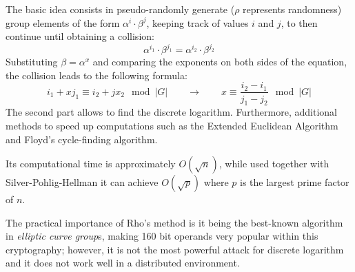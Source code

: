 The basic idea consists in pseudo-randomly generate ($\rho$ represents randomness) group elements of the form $\alpha^i \cdot \beta^j$, keeping track of values $i$ and $j$, to then continue until obtaining a collision:
$$\alpha^{i_1} \cdot \beta^{j_1} = \alpha^{i_2} \cdot \beta^{j_2}$$
Substituting $\beta = \alpha^x$ and comparing the exponents on both sides of the equation, the collision leads to the following formula:
$$i_1 + xj_1 \equiv i_2 + jx_2 \mod |G| \qquad \rightarrow \qquad x \equiv \frac{i_2 - i_1}{j_1 - j_2} \mod |G|$$ 
The second part allows to find the discrete logarithm. Furthermore, additional methods to speed up computations such as the Extended Euclidean Algorithm and Floyd's cycle-finding algorithm.

Its computational time is approximately $O(\sqrt{n})$, while used together with Silver-Pohlig-Hellman it can achieve $O(\sqrt{p})$ where $p$ is the largest prime factor of $n$.

The practical importance of Rho's method is it being the best-known algorithm in \textit{elliptic curve group}s, making 160 bit operands very popular within this cryptography; however, it is not the most powerful attack for discrete logarithm and it does not work well in a distributed environment.


